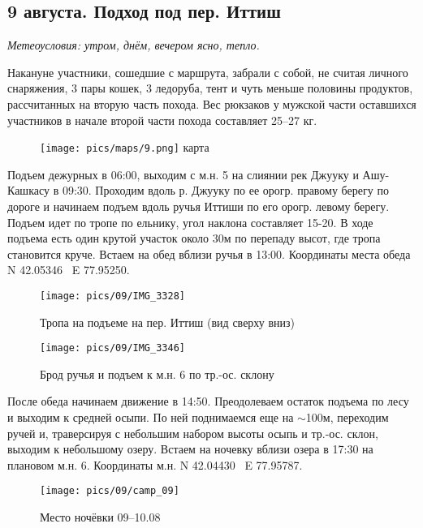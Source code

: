 \subsection{9 августа. Подход под пер. Иттиш}
\textit{Метеоусловия: утром, днём, вечером ясно, тепло.}

Накануне участники, сошедшие с маршрута, забрали с собой, не считая личного снаряжения, 3 пары кошек, 3 ледоруба, тент и чуть меньше половины продуктов, рассчитанных на вторую часть похода. Вес рюкзаков у мужской части оставшихся участников в начале второй части похода составляет 25--27 кг.

\begin{figure}[h!]
	\centering
	\texttt{[image: pics/maps/9.png]}
	\alert{карта}
	\label{fig:mini_9}
\end{figure}

Подъем дежурных в 06:00, выходим с м.н. 5 на слиянии рек Джууку и Ашу-Кашкасу в 09:30. Проходим вдоль р. Джууку по ее орогр. правому берегу  по дороге и начинаем подъем вдоль ручья Иттиши по его орогр. левому берегу. Подъем идет по тропе по ельнику, угол наклона составляет 15-20\degree. В ходе подъема есть один крутой участок около 30м по перепаду высот, где тропа становится круче. Встаем на обед вблизи ручья в 13:00. Координаты места обеда N 42.05346\degree~ E 77.95250\degree.

\begin{figure}[h!]
	\centering
	\texttt{[image: pics/09/IMG\_3328]}
	\caption{Тропа на подъеме на пер. Иттиш (вид сверху вниз)}
	\label{fig:IMG_3328}
\end{figure}

\begin{figure}[h!]
	\centering
	\texttt{[image: pics/09/IMG\_3346]}
	\caption{Брод ручья и подъем к м.н. 6 по тр.-ос. склону}
	\label{fig:IMG_3346}
\end{figure}


После обеда начинаем движение в 14:50. Преодолеваем остаток подъема по лесу и выходим к средней осыпи. По ней поднимаемся еще на $\sim$100м, переходим ручей и, траверсируя с небольшим набором высоты осыпь и тр.-ос. склон, выходим к небольшому озеру. Встаем на ночевку вблизи озера в 17:30 на плановом м.н. 6. Координаты м.н. N 42.04430\degree~ E 77.95787\degree.


\begin{figure}[h!]
	\centering
	\texttt{[image: pics/09/camp\_09]} %
	\caption{Место ночёвки 09--10.08}
	\label{fig:camp_09}
\end{figure}

\clearpage